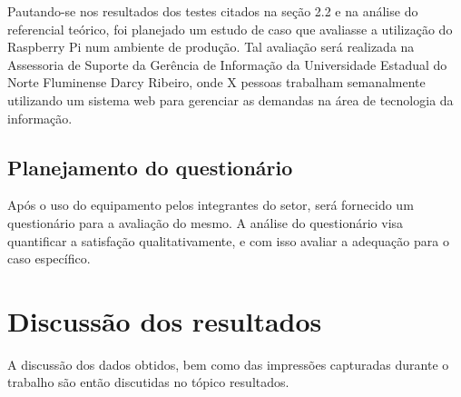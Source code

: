 Pautando-se nos resultados dos testes citados na seção 2.2 e na análise do referencial teórico, foi planejado um estudo de caso que avaliasse a utilização do Raspberry Pi num ambiente de produção. Tal avaliação será realizada na Assessoria de Suporte da Gerência de Informação da Universidade Estadual do Norte Fluminense Darcy Ribeiro, onde X pessoas trabalham semanalmente utilizando um sistema web para gerenciar as demandas na área de tecnologia da informação.

\subsection{Planejamento do questionário}

Após o uso do equipamento pelos integrantes do setor, será fornecido um questionário para a avaliação do mesmo. A análise do questionário visa quantificar a satisfação qualitativamente, e com isso avaliar a adequação para o caso específico.

\section{Discussão dos resultados}

A discussão dos dados obtidos, bem como das impressões capturadas durante o trabalho são então discutidas no tópico resultados.